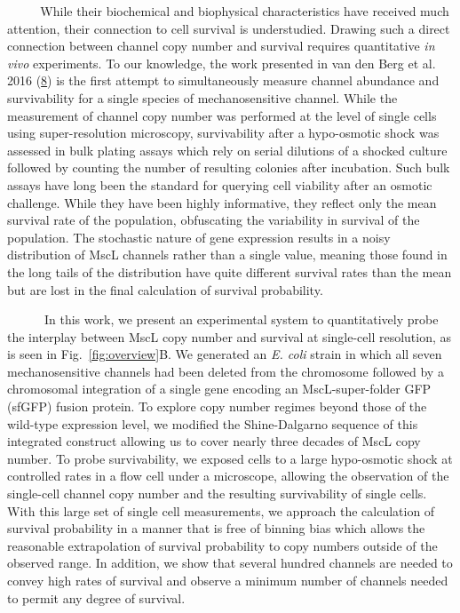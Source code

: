 ~~~ ~
While
their
biochemical
and
biophysical
characteristics
have
received
much
attention,
their
connection
to
cell
survival
is
understudied.
Drawing
such a
direct
connection
between
channel
copy
number
and
survival
requires
quantitative
\emph{in
vivo}
experiments.
To our
knowledge,
the
work
presented
in van
den
Berg
et al.
2016
(\protect\hyperlink{ref-vandenberg2016}{8})
is the
first
attempt
to
simultaneously
measure
channel
abundance
and
survivability
for a
single
species
of
mechanosensitive
channel.
While
the
measurement
of
channel
copy
number
was
performed
at the
level
of
single
cells
using
super-resolution
microscopy,
survivability
after
a
hypo-osmotic
shock
was
assessed
in
bulk
plating
assays
which
rely
on
serial
dilutions
of a
shocked
culture
followed
by
counting
the
number
of
resulting
colonies
after
incubation.
Such
bulk
assays
have
long
been
the
standard
for
querying
cell
viability
after
an
osmotic
challenge.
While
they
have
been
highly
informative,
they
reflect
only
the
mean
survival
rate
of the
population,
obfuscating
the
variability
in
survival
of the
population.
The
stochastic
nature
of
gene
expression
results
in a
noisy
distribution
of
MscL
channels
rather
than a
single
value,
meaning
those
found
in the
long
tails
of the
distribution
have
quite
different
survival
rates
than
the
mean
but
are
lost
in the
final
calculation
of
survival
probability.

~ ~ ~
~In
this
work,
we
present
an
experimental
system
to
quantitatively
probe
the
interplay
between
MscL
copy
number
and
survival
at
single-cell
resolution,
as is
seen
in
Fig.~\ref{fig:overview}B.
We
generated
an
\emph{E.
coli}
strain
in
which
all
seven
mechanosensitive
channels
had
been
deleted
from
the
chromosome
followed
by a
chromosomal
integration
of a
single
gene
encoding
an
MscL-super-folder
GFP
(sfGFP)
fusion
protein.
To
explore
copy
number
regimes
beyond
those
of the
wild-type
expression
level,
we
modified
the
Shine-Dalgarno
sequence
of
this
integrated
construct
allowing
us to
cover
nearly
three
decades
of
MscL
copy
number.
To
probe
survivability,
we
exposed
cells
to a
large
hypo-osmotic
shock
at
controlled
rates
in a
flow
cell
under
a
microscope,
allowing
the
observation
of the
single-cell
channel
copy
number
and
the
resulting
survivability
of
single
cells.
With
this
large
set of
single
cell
measurements,
we
approach
the
calculation
of
survival
probability
in a
manner
that
is
free
of
binning
bias
which
allows
the
reasonable
extrapolation
of
survival
probability
to
copy
numbers
outside
of the
observed
range.
In
addition,
we
show
that
several
hundred
channels
are
needed
to
convey
high
rates
of
survival
and
observe
a
minimum
number
of
channels
needed
to
permit
any
degree
of
survival.


